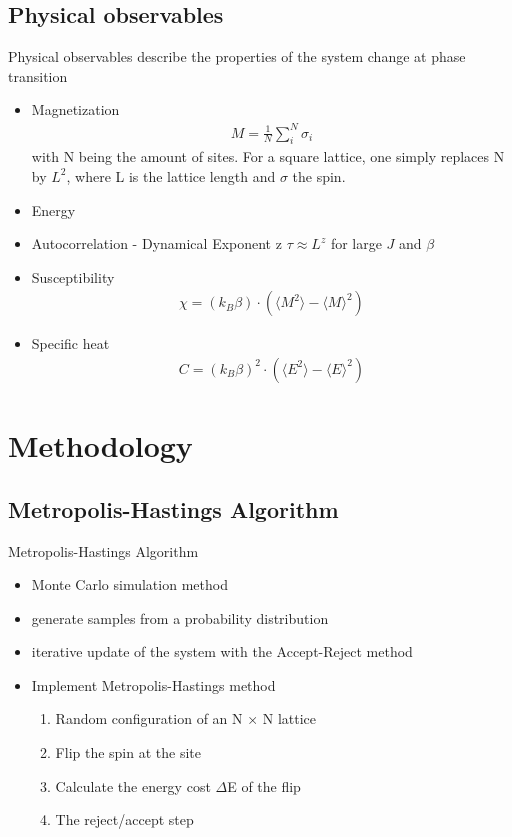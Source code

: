 \documentclass{beamer}
\begin{document}
\subsection{Physical observables}
\begin{frame}{Physical observables}
    describe the properties of the system change at phase transition   
    \begin{itemize}
        \item Magnetization 
            \begin{align}
            M = \frac{1}{N}\sum_{i}^{N} \sigma_{i}
            \end{align}
            with N being the amount of sites. For a square lattice, one simply replaces N by $L^{2}$, where L is the lattice length and $\sigma$ the spin. \\
        \item Energy
        \item Autocorrelation - Dynamical Exponent z
             $\tau \approx L^z$ for large $J$ and $\beta$ 
        \item Susceptibility
        \begin{align}
    \chi = (k_B \beta) \cdot (\langle M^2 \rangle-\langle M \rangle^2)
\end{align}
        \item Specific heat
        \begin{align}
    C = (k_B \beta)^2 \cdot (\langle E^2 \rangle-\langle E \rangle^2) 
\end{align}
    \end{itemize}
\end{frame}


\section{Methodology}

\subsection{Metropolis-Hastings Algorithm}
\begin{frame}{Metropolis-Hastings Algorithm}
    \begin{itemize}
        \item Monte Carlo simulation method 
        \item generate samples from a probability distribution
        \item iterative update of the system with the Accept-Reject method
        \item Implement Metropolis-Hastings method
        \begin{enumerate}
            \item Random configuration of an N × N lattice
            \item  Flip the spin at the site
            \item Calculate the energy cost $\Delta$E of the flip
            \item The reject/accept step
        \end{enumerate}
        
    \end{itemize}
\end{frame}
\end{document}
